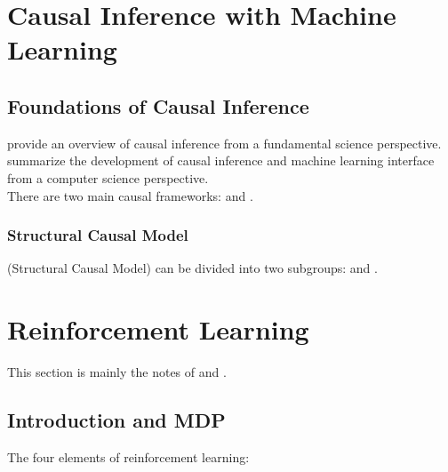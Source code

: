 \documentclass[12pt]{report}
\begin{document}
\clearpage
\section{Causal Inference with Machine Learning}

\subsection{Foundations of Causal Inference}

\cite{peters2017elements} provide an overview of causal inference from a fundamental science perspective. \cite{spirtes2010introduction}
summarize the development of causal inference and machine learning interface from a computer science perspective.\\
There are two main causal frameworks:  and .

\subsubsection{Structural Causal Model}
 (Structural Causal Model) can be divided into two subgroups:  and .

\clearpage
\section{Reinforcement Learning}

This section is mainly the notes of \cite{thrun2000reinforcement} and \cite{agarwal2019reinforcement}.

\subsection{Introduction and MDP}


\no The four elements of reinforcement learning:
\end{document}
